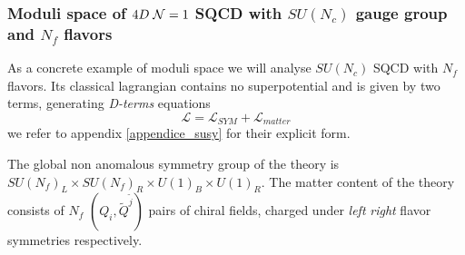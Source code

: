 \subsubsection{Moduli space of $4D \; \mathcal{N}=1$ SQCD with $SU(N_c)$ gauge group and $N_f$ flavors}
As a concrete example of moduli space we will analyse $SU(N_c)$ SQCD with $N_f$ flavors.
Its classical lagrangian contains no superpotential and is given by two terms, generating \emph{D-terms} equations
\begin{equation}
\mathcal{L } =  \mathcal{L }_{SYM} + \mathcal{L }_{matter} 
\end{equation}
we refer to appendix \ref{appendice_susy} for their explicit form.

The global non anomalous symmetry group of the theory is $SU(N_f)_L \times SU(N_f)_R \times U(1)_B \times U(1)_R$. 
The matter content of the theory consists of $N_f$ $(Q_i, \tilde{Q}^{\tilde{j}})$ pairs of chiral fields, charged under \emph{left}  \emph{right} flavor symmetries respectively. 





